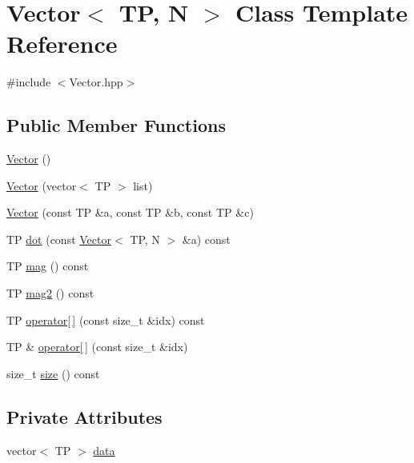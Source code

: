 \hypertarget{classVector}{\section{\-Vector$<$ \-T\-P, \-N $>$ \-Class \-Template \-Reference}
\label{classVector}
}


{\ttfamily \#include $<$\-Vector.\-hpp$>$}

\subsection*{\-Public \-Member \-Functions}
\begin{DoxyCompactItemize}
\item 
\hyperlink{classVector_af8d64081ba88c991d3ccc580f6b991ae}{\-Vector} ()
\item 
\hyperlink{classVector_aa49dad25782b5ac06d26a528483faaad}{\-Vector} (vector$<$ \-T\-P $>$ list)
\item 
\hyperlink{classVector_ac49edfebf7cc1ddb9e8d1c7d4fe3a4ac}{\-Vector} (const \-T\-P \&a, const \-T\-P \&b, const \-T\-P \&c)
\item 
\-T\-P \hyperlink{classVector_a1b6508dd628974c4b241f11ca07bdb1c}{dot} (const \hyperlink{classVector}{\-Vector}$<$ \-T\-P, \-N $>$ \&a) const 
\item 
\-T\-P \hyperlink{classVector_a33d7a69440e9d33775e5df6e1c3db1bb}{mag} () const 
\item 
\-T\-P \hyperlink{classVector_a76f160597b7f66f639cb30ccc7be3f5c}{mag2} () const 
\item 
\-T\-P \hyperlink{classVector_a2710799e307b1bcb364d9c5c58fa8ccd}{operator\mbox{[}$\,$\mbox{]}} (const size\-\_\-t \&idx) const 
\item 
\-T\-P \& \hyperlink{classVector_a9aa5c458b3852050b0e6f5cdbc9a2fa1}{operator\mbox{[}$\,$\mbox{]}} (const size\-\_\-t \&idx)
\item 
size\-\_\-t \hyperlink{classVector_a90fcfa8000a25dbdb1d156b525a5e608}{size} () const 
\end{DoxyCompactItemize}
\subsection*{\-Private \-Attributes}
\begin{DoxyCompactItemize}
\item 
vector$<$ \-T\-P $>$ \hyperlink{classVector_aa52e615f6f3fefb7c824d88d4597dc91}{data}
\end{DoxyCompactItemize}
